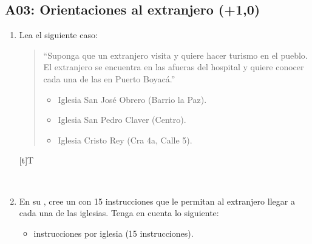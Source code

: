 \documentclass[letterpaper,10pt,spanish]{sphinxmanual}
\let\sphinxpxdimen\pdfpxdimen\else\newdimen\sphinxpxdimen
\begin{document}
\subsection{A03: Orientaciones al extranjero (+1,0)}
\label{\detokenize{1_guias/10programacion/G1023:a03-orientaciones-al-extranjero-1-0}}
\sphinxAtStartPar
{}
\begin{enumerate}
%
\item {} 
\sphinxAtStartPar
Lea el siguiente caso:
\begin{quote}

\sphinxAtStartPar
“Suponga que un extranjero visita  y quiere hacer turismo en el pueblo.
El extranjero se encuentra en las afueras del hospital  y quiere conocer cada una de las  en Puerto Boyacá.”
\begin{itemize}
\item {} 
\sphinxAtStartPar
Iglesia San José Obrero (Barrio la Paz).

\item {} 
\sphinxAtStartPar
Iglesia San Pedro Claver (Centro).

\item {} 
\sphinxAtStartPar
Iglesia Cristo Rey (Cra 4a, Calle 5).

\end{itemize}
\end{quote}


\begin{savenotes}\sphinxattablestart
\sphinxthistablewithglobalstyle
\centering
\begin{tabulary}{\linewidth}[t]{T}
\sphinxtoprule
\sphinxtableatstartofbodyhook

\begin{sphinxfigure-in-table}
\centering
\capstart
\noindent\sphinxincludegraphics[width=650\sphinxpxdimen]{{image114}.png}
\label{\detokenize{1_guias/10programacion/G1023:id14}}\end{sphinxfigure-in-table}\relax
\\
\sphinxbottomrule
\end{tabulary}
\sphinxtableafterendhook\par
\sphinxattableend\end{savenotes}

\item {} 
\sphinxAtStartPar
En su , cree un  con 15 instrucciones que le permitan al extranjero llegar a cada una de las iglesias. Tenga en cuenta lo siguiente:
\begin{itemize}
\item {} 
 instrucciones por iglesia (15 instrucciones).


\end{itemize}
\end{enumerate}
\end{document}
